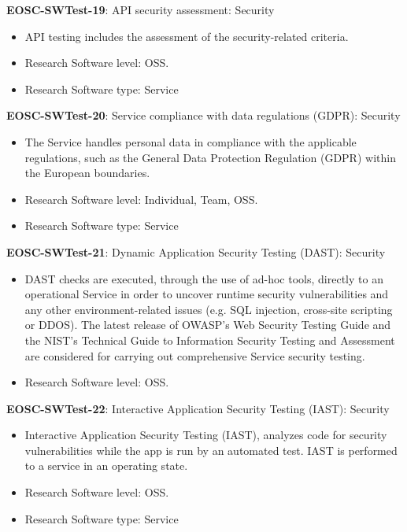 \textbf{EOSC-SWTest-19}: API security assessment: Security

\begin{itemize}
    \item API testing includes the assessment of the security-related criteria.~\cite{orviz_fernandez_eosc-synergy_2020}
    \item Research Software level: OSS.
    \item Research Software type: Service
\end{itemize}

\textbf{EOSC-SWTest-20}: Service compliance with data regulations (GDPR): Security

\begin{itemize}
    \item The Service handles personal data in compliance with the applicable regulations, such as the General Data Protection Regulation (GDPR) within the European boundaries.~\cite{orviz_fernandez_eosc-synergy_2020}
    \item Research Software level: Individual, Team, OSS.
    \item Research Software type: Service
\end{itemize}

\textbf{EOSC-SWTest-21}: Dynamic Application Security Testing (DAST): Security

\begin{itemize}
    \item DAST checks are executed, through the use of ad-hoc tools, directly to an operational Service in order to uncover runtime security vulnerabilities and any other environment-related issues (e.g. SQL injection, cross-site scripting or DDOS). The latest release of OWASP's Web Security Testing Guide and the NIST's Technical Guide to Information Security Testing and Assessment are considered for carrying out comprehensive Service security testing.~\cite{orviz_fernandez_eosc-synergy_2020}
    \item Research Software level: OSS.
\end{itemize}

\textbf{EOSC-SWTest-22}: Interactive Application Security Testing (IAST): Security

\begin{itemize}
    \item Interactive Application Security Testing (IAST), analyzes code for security vulnerabilities while the app is run by an automated test. IAST is performed to a service in an operating state.~\cite{orviz_fernandez_eosc-synergy_2020}
    \item Research Software level: OSS.
    \item Research Software type: Service
\end{itemize}

